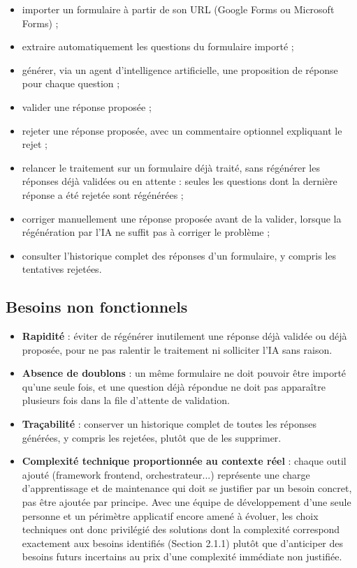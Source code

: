 \documentclass[12pt,a4paper]{report}
\begin{document}
\begin{itemize}
    \item importer un formulaire à partir de son URL (Google Forms ou
    Microsoft Forms) ;
    \item extraire automatiquement les questions du formulaire importé ;
    \item générer, via un agent d'intelligence artificielle, une proposition
    de réponse pour chaque question ;
    \item valider une réponse proposée ;
    \item rejeter une réponse proposée, avec un commentaire optionnel
    expliquant le rejet ;
    \item relancer le traitement sur un formulaire déjà traité, sans
    régénérer les réponses déjà validées ou en attente : seules les
    questions dont la dernière réponse a été rejetée sont régénérées ;
    \item corriger manuellement une réponse proposée avant de la valider,
    lorsque la régénération par l'IA ne suffit pas à corriger le problème ;
    \item consulter l'historique complet des réponses d'un formulaire,
    y compris les tentatives rejetées.
\end{itemize}

\subsection{Besoins non fonctionnels}

\begin{itemize}
    \item \textbf{Rapidité} : éviter de régénérer inutilement une réponse
    déjà validée ou déjà proposée, pour ne pas ralentir le traitement ni
    solliciter l'IA sans raison.
    \item \textbf{Absence de doublons} : un même formulaire ne doit pouvoir
    être importé qu'une seule fois, et une question déjà répondue ne doit
    pas apparaître plusieurs fois dans la file d'attente de validation.
    \item \textbf{Traçabilité} : conserver un historique complet de toutes
    les réponses générées, y compris les rejetées, plutôt que de les
    supprimer.
    \item \textbf{Complexité technique proportionnée au contexte réel} :
    chaque outil ajouté (framework frontend, orchestrateur...) représente
    une charge d'apprentissage et de maintenance qui doit se justifier par
    un besoin concret, pas être ajoutée par principe. Avec une équipe de
    développement d'une seule personne et un périmètre applicatif encore
    amené à évoluer, les choix techniques ont donc privilégié des
    solutions dont la complexité correspond exactement aux besoins
    identifiés (Section 2.1.1) plutôt que d'anticiper des besoins futurs
    incertains au prix d'une complexité immédiate non justifiée.
\end{itemize}
\end{document}
